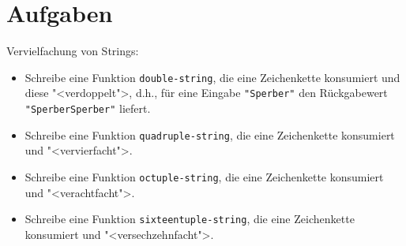 \section*{Aufgaben}



\begin{aufgabe}
 Vervielfachung von Strings:
 \begin{itemize}
  \item Schreibe eine Funktion \texttt{double-string}, die eine Zeichenkette konsumiert und
    diese "<verdoppelt">, d.h., für eine Eingabe \verb|"Sperber"| den
    Rückgabewert \verb|"SperberSperber"| liefert.
    
  \item Schreibe eine Funktion \texttt{quadruple-string}, die eine
    Zeichenkette konsumiert und "<vervierfacht">.

  \item Schreibe eine Funktion \texttt{octuple-string}, die eine
    Zeichenkette konsumiert und "<verachtfacht">.

  \item Schreibe eine Funktion \texttt{sixteentuple-string}, die
    eine Zeichenkette konsumiert und "<versechzehnfacht">.
  \end{itemize}


\end{aufgabe}

